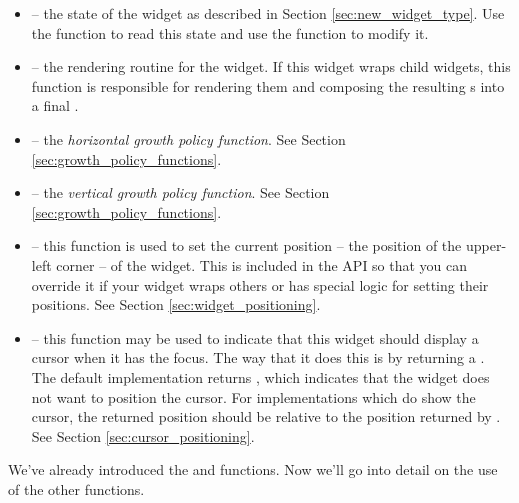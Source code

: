 \begin{itemize}
\item {} -- the state of the widget as described in Section
  \ref{sec:new_widget_type}.  Use the  function to read
  this state and use the  function to modify it.
\item {} -- the rendering routine for the widget.  If this
  widget wraps child widgets, this function is responsible for
  rendering them and composing the resulting s into a final
  .
\item {} -- the \textit{horizontal growth policy
  function}.  See Section \ref{sec:growth_policy_functions}.
\item {} -- the \textit{vertical growth policy
  function}.  See Section \ref{sec:growth_policy_functions}.
\item {} -- this function is used to set the
  current position -- the position of the upper-left corner -- of the
  widget.  This is included in the  API so that you can
  override it if your widget wraps others or has special logic for
  setting their positions.  See Section \ref{sec:widget_positioning}.
\item {} -- this function may be used to
  indicate that this widget should display a cursor when it has the
  focus.  The way that it does this is by returning a
  .  The default implementation returns
  , which indicates that the widget does not want to
  position the cursor.  For implementations which do show the cursor,
  the returned position should be relative to the position returned by
  .  See Section \ref{sec:cursor_positioning}.
\end{itemize}

We've already introduced the  and  functions.
Now we'll go into detail on the use of the other functions.
